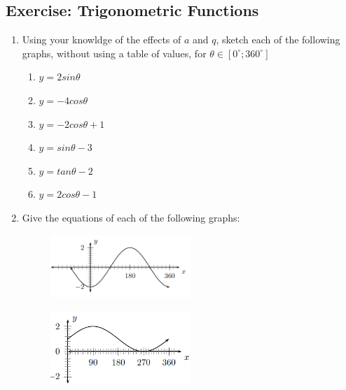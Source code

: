 \subsection*{Exercise: Trigonometric Functions }
\nopagebreak
\begin{enumerate}[noitemsep, label=\textbf{\arabic*}. ] 
\item Using your knowldge of the effects of $a$ and $q$, sketch each of the following graphs, without using a table of values, for $\theta \in [{0}^{\circ };{360}^{\circ }]$
\begin{enumerate}[noitemsep, label=\textbf{\alph*}. ] 
\item $y=2sin\theta $
\item $y=-4cos\theta $
\item $y=-2cos\theta +1$
\item $y=sin\theta -3$
\item $y=tan\theta -2$\item $y=2cos\theta -1$\end{enumerate}
  \item Give the equations of each of the following graphs:
\setcounter{subfigure}{0}
\begin{figure}[H] %
\begin{center}
\label{m39414*id92152!!!underscore!!!media}\label{m39414*id92152!!!underscore!!!printimage}\includegraphics[width=200px]{col11306.imgs/m39414_trigrep4.png} %
\vspace{2pt}
\vspace{.1in}
\end{center}
\end{figure}       
\setcounter{subfigure}{0}
\begin{figure}[H] %
\begin{center}
\label{m39414*id92162!!!underscore!!!media}\label{m39414*id92162!!!underscore!!!printimage}\includegraphics[width=200px]{col11306.imgs/m39414_trigrep5.png} %

\end{center}
\end{figure}
\end{enumerate}
